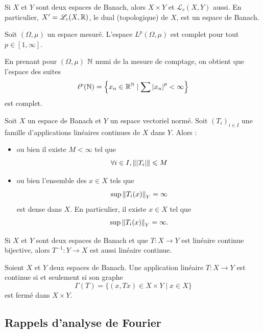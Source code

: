\documentclass[twocolumn, landscape]{article}
\begin{document}
\begin{prop}
    Si $X$ et $Y$ sont deux espaces de Banach, alors $X\times Y$ et $\mathscr{L}_c(X, Y)$ aussi. En particulier, $X' = \mathscr{L}_c(X, \mathbb{R})$, le dual (topologique) de $X$, est un espace de Banach.
\end{prop}

\begin{theo}
    Soit $(\Omega, \mu)$ un espace mesuré. L'espace $L^p(\Omega, \mu)$ est complet pour tout $p \in [1, \infty]$.
\end{theo}

\begin{exem}
    En prenant pour $(\Omega, \mu)$ $\mathbb{N}$ muni de la mesure de comptage, on obtient que l'espace des suites
    $$\ell^p(\mathbb{N}) = \left\{ x_n \in \mathbb{R}^{\mathbb{N}} \mid \sum \left\lvert x_n \right\rvert^p < \infty \right\}$$
    est complet. 
\end{exem}

\begin{theo}
    Soit $X$ un espace de Banach et $Y$ un espace vectoriel normé. Soit $(T_i)_{i\in I}$ une famille d'applications linéaires continues de $X$ dans $Y$. Alors :
    \begin{itemize}
        \item ou bien il existe $M < \infty$ tel que $$\forall i \in I, \left\lVert \left\lvert T_i \right\rvert \right\rVert \leqslant M$$
        \item ou bien l'ensemble des $x\in X$ tels que $$\sup \left\lVert T_i(x) \right\rVert_Y = \infty$$
        est dense dans $X$. En particulier, il existe $x\in X$ tel que $$\sup \left\lVert T_i(x) \right\rVert_Y = \infty.$$
    \end{itemize}
\end{theo}

\begin{theo}
    Si $X$ et $Y$ sont deux espaces de Banach et que $T: X\to Y$ est linéaire continue bijective, alors $T^{-1} : Y \to X$ est aussi linéaire continue.
\end{theo}

\begin{theo}
    Soient $X$ et $Y$ deux espaces de Banach. Une application linéaire $T : X\to Y$ est continue si et seulement si son graphe $$\Gamma(T) = \{ (x, Tx) \in X\times Y \mid x\in X \}$$est fermé dans $X\times Y$.
\end{theo}

\subsection{Rappels d'analyse de Fourier}
\end{document}
